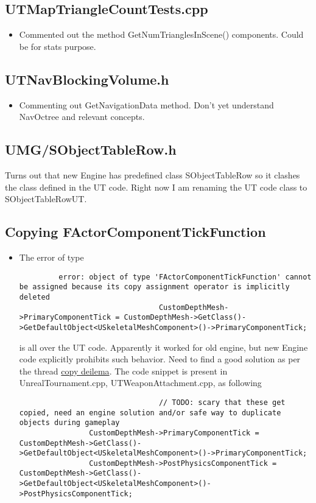 \documentclass{article}
\begin{document}
    \subsection{UTMapTriangleCountTests.cpp}
    \begin{itemize}
    \item Commented out the method GetNumTrianglesInScene() components.  Could be for stats purpose.
    \end{itemize}
    \subsection{UTNavBlockingVolume.h}
    \begin{itemize}
    \item Commenting out GetNavigationData method.  Don't yet understand NavOctree and relevant concepts.
    \end{itemize}
    \subsection{UMG/SObjectTableRow.h}
    Turns out that new Engine has predefined class SObjectTableRow so it clashes the class defined in the UT code.  Right now I am renaming the UT code class to SObjectTableRowUT.
    \subsection{Copying FActorComponentTickFunction}
    \begin{itemize}
    \item The error of type
      \lstset{language=c++}
      \begin{lstlisting}
         error: object of type 'FActorComponentTickFunction' cannot be assigned because its copy assignment operator is implicitly deleted
                                CustomDepthMesh->PrimaryComponentTick = CustomDepthMesh->GetClass()->GetDefaultObject<USkeletalMeshComponent>()->PrimaryComponentTick;
                              \end{lstlisting}
                              is all over the UT code.  Apparently it worked for old engine, but new Engine code explicitly prohibits such behavior.  Need to find a good solution as per the thread \href{https://forums.unrealengine.com/development-discussion/c-gameplay-programming/1622887-copying-structures-in-the-engine}{copy deilema}.  The code snippet is present in {\color{filecolor}UnrealTournament.cpp}, {\color{filecolor}UTWeaponAttachment.cpp},  as following
                              \lstset{language=c++}
                              \begin{lstlisting}
                                // TODO: scary that these get copied, need an engine solution and/or safe way to duplicate objects during gameplay
				CustomDepthMesh->PrimaryComponentTick = CustomDepthMesh->GetClass()->GetDefaultObject<USkeletalMeshComponent>()->PrimaryComponentTick;
				CustomDepthMesh->PostPhysicsComponentTick = CustomDepthMesh->GetClass()->GetDefaultObject<USkeletalMeshComponent>()->PostPhysicsComponentTick;
                              \end{lstlisting}
                            \end{itemize}
\end{document}
